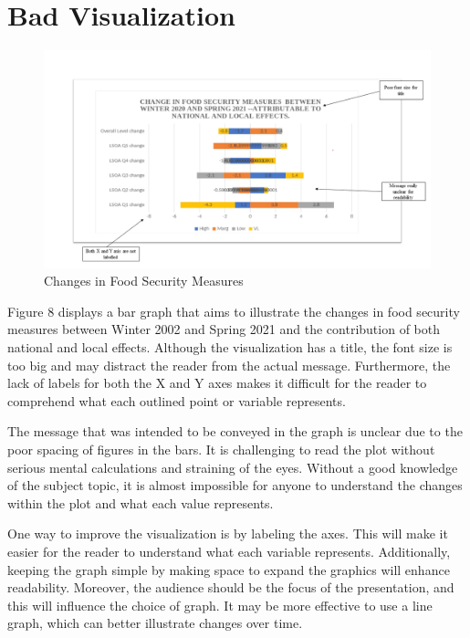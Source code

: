 \documentclass[
]{article}
\begin{document}
\newpage

\hypertarget{bad-visualization}{%
\section{Bad Visualization}\label{bad-visualization}}

\begin{figure}
\includegraphics[width=1\linewidth]{../Images/Bad Viz} \caption{Changes in Food Security Measures}\label{fig:Bad Visualization}
\end{figure}

Figure 8 displays a bar graph that aims to illustrate the changes in
food security measures between Winter 2002 and Spring 2021 and the
contribution of both national and local effects. Although the
visualization has a title, the font size is too big and may distract the
reader from the actual message. Furthermore, the lack of labels for both
the X and Y axes makes it difficult for the reader to comprehend what
each outlined point or variable represents.

The message that was intended to be conveyed in the graph is unclear due
to the poor spacing of figures in the bars. It is challenging to read
the plot without serious mental calculations and straining of the eyes.
Without a good knowledge of the subject topic, it is almost impossible
for anyone to understand the changes within the plot and what each value
represents.

One way to improve the visualization is by labeling the axes. This will
make it easier for the reader to understand what each variable
represents. Additionally, keeping the graph simple by making space to
expand the graphics will enhance readability. Moreover, the audience
should be the focus of the presentation, and this will influence the
choice of graph. It may be more effective to use a line graph, which can
better illustrate changes over time.
\end{document}
